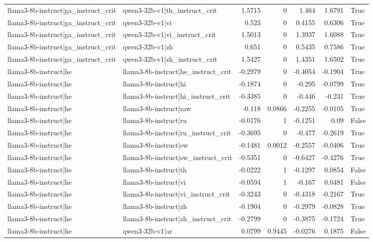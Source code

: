 \begin{table}
\begin{tabular}{l l r r r r l}
llama3-8b-instruct|ga_instruct_crit & qwen3-32b-v1|th_instruct_crit & 1.5715 & 0 & 1.464 & 1.6791 & True \\
llama3-8b-instruct|ga_instruct_crit & qwen3-32b-v1|vi & 0.523 & 0 & 0.4155 & 0.6306 & True \\
llama3-8b-instruct|ga_instruct_crit & qwen3-32b-v1|vi_instruct_crit & 1.5013 & 0 & 1.3937 & 1.6088 & True \\
llama3-8b-instruct|ga_instruct_crit & qwen3-32b-v1|zh & 0.651 & 0 & 0.5435 & 0.7586 & True \\
llama3-8b-instruct|ga_instruct_crit & qwen3-32b-v1|zh_instruct_crit & 1.5427 & 0 & 1.4351 & 1.6502 & True \\
llama3-8b-instruct|he & llama3-8b-instruct|he_instruct_crit & -0.2979 & 0 & -0.4054 & -0.1904 & True \\
llama3-8b-instruct|he & llama3-8b-instruct|hi & -0.1874 & 0 & -0.295 & -0.0799 & True \\
llama3-8b-instruct|he & llama3-8b-instruct|hi_instruct_crit & -0.3385 & 0 & -0.446 & -0.231 & True \\
llama3-8b-instruct|he & llama3-8b-instruct|raw & -0.118 & 0.0866 & -0.2255 & -0.0105 & True \\
llama3-8b-instruct|he & llama3-8b-instruct|ru & -0.0176 & 1 & -0.1251 & 0.09 & False \\
llama3-8b-instruct|he & llama3-8b-instruct|ru_instruct_crit & -0.3695 & 0 & -0.477 & -0.2619 & True \\
llama3-8b-instruct|he & llama3-8b-instruct|sw & -0.1481 & 0.0012 & -0.2557 & -0.0406 & True \\
llama3-8b-instruct|he & llama3-8b-instruct|sw_instruct_crit & -0.5351 & 0 & -0.6427 & -0.4276 & True \\
llama3-8b-instruct|he & llama3-8b-instruct|th & -0.0222 & 1 & -0.1297 & 0.0854 & False \\
llama3-8b-instruct|he & llama3-8b-instruct|vi & -0.0594 & 1 & -0.167 & 0.0481 & False \\
llama3-8b-instruct|he & llama3-8b-instruct|vi_instruct_crit & -0.3243 & 0 & -0.4318 & -0.2167 & True \\
llama3-8b-instruct|he & llama3-8b-instruct|zh & -0.1904 & 0 & -0.2979 & -0.0828 & True \\
llama3-8b-instruct|he & llama3-8b-instruct|zh_instruct_crit & -0.2799 & 0 & -0.3875 & -0.1724 & True \\
llama3-8b-instruct|he & qwen3-32b-v1|ar & 0.0799 & 0.9445 & -0.0276 & 0.1875 & False \\

\end{tabular}
\end{table}
